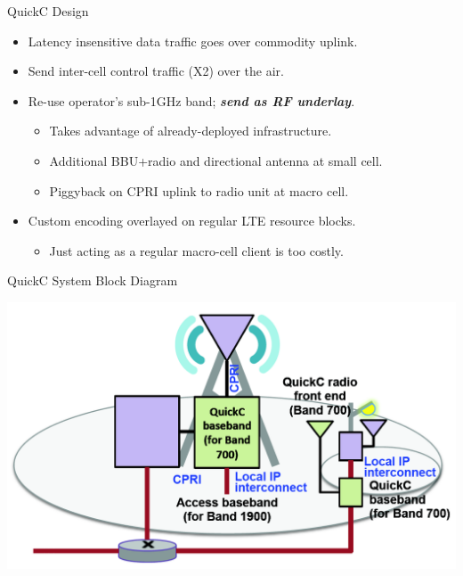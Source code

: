 \documentclass[xcolor=pdftex,dvipsnames,table]{beamer}
\begin{document}
\begin{frame}{QuickC Design}
  \begin{itemize}
  \item Latency insensitive data traffic goes over commodity uplink.
  \item Send inter-cell control traffic (X2) over the air.
  \item Re-use operator's sub-1GHz band; \emph{\bf send as RF underlay}.
    \begin{itemize}
    \item Takes advantage of already-deployed infrastructure.
    \item Additional BBU+radio and directional antenna at small cell.
    \item Piggyback on CPRI uplink to radio unit at macro cell.
    \end{itemize}
  \item Custom encoding overlayed on regular LTE resource blocks.
    \begin{itemize}
    \item Just acting as a regular macro-cell client is too costly.
    \end{itemize}
  \end{itemize}
\end{frame}

\begin{frame}{QuickC System Block Diagram}
  \centerline{\includegraphics[width=\textwidth]{./figs/quickc-blockdiagram.png}}
\end{frame}
\end{document}
